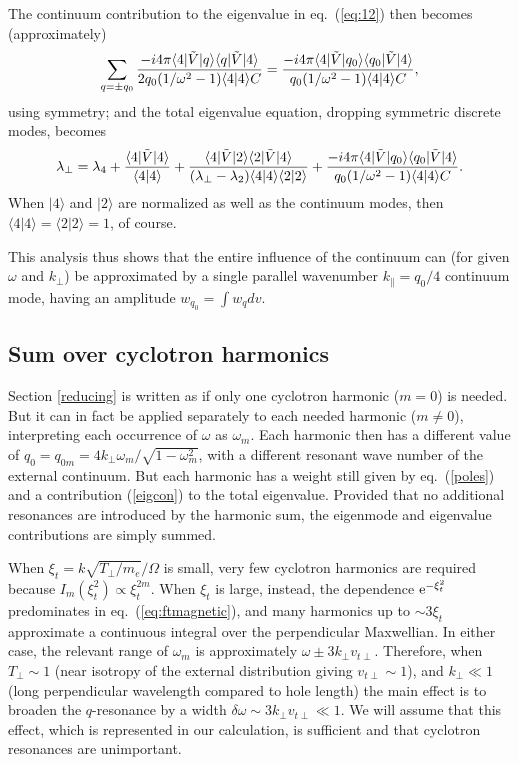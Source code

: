 \documentclass[12pt]{article}
\def\ket#1{|#1\rangle}
\def\bra#1{\langle#1}
\def\etothe#1{{\rm e}^{#1}}
\begin{document}
The continuum contribution to the eigenvalue in eq.\ (\ref{eq:12}) then
becomes (approximately)
\begin{equation}
  \label{eigcon}
  \sum_{q=\pm q_0} {-i4\pi\bra{4}|\tilde V \ket{q}\bra{q}|\tilde{V}\ket{4}
    \over
    2q_0(1/\omega^2-1)\bra{4}\ket{4}C}
  ={-i4\pi\bra{4}|\tilde V \ket{q_0}\bra{q_0}|\tilde{V}\ket{4}
    \over
    q_0(1/\omega^2-1)\bra{4}\ket{4}C},
\end{equation}
using symmetry; and the total eigenvalue equation, dropping symmetric discrete modes, becomes
\begin{equation}
  \label{eigtotal}
  \lambda_\perp=\lambda_4+{\bra{4}|\tilde{V}\ket{4}\over
    \bra{4}\ket{4}}
    +{\bra{4}|\tilde{V}\ket{2}\bra{2}|\tilde{V}\ket{4}\over
      (\lambda_\perp-\lambda_2)\bra{4}\ket{4} \bra{2}\ket{2}}
    +%
    {-i4\pi\bra{4}|\tilde V \ket{q_0}\bra{q_0}|\tilde{V}\ket{4}
    \over
    q_0(1/\omega^2-1)\bra{4}\ket{4}C}.
\end{equation}
When $\ket{4}$ and $\ket{2}$ are normalized as well as the
continuum modes, then $\bra{4}\ket{4}=\bra{2}\ket{2}=1$, of
course.

This analysis thus shows that the entire influence of the continuum
can (for given $\omega$ and $k_\perp$) be approximated by a single
parallel wavenumber $k_\parallel= q_0/4$ continuum mode, having an
amplitude $w_{q_0}=\int w_q dv$.

\subsection{Sum over cyclotron harmonics}

Section \ref{reducing} is written as if only one cyclotron harmonic
($m=0$) is needed. But it can in fact be applied separately to each
needed harmonic ($m\not=0$), interpreting each occurrence of $\omega$
as $\omega_m$. Each harmonic then has a different value of
$q_0=q_{0m}=4k_\perp\omega_m/\sqrt{1-\omega_m^2}$, with a different
resonant wave number of the external continuum. But each harmonic has
a weight still given by eq.\ (\ref{poles}) and a contribution
(\ref{eigcon}) to the total eigenvalue. Provided that no additional
resonances are introduced by the harmonic sum, the eigenmode and
eigenvalue contributions are simply summed.

When $\xi_t=k\sqrt{T_\perp/m_e}/\Omega$ is small, very few cyclotron
harmonics are required because $I_m(\xi_t^2)\propto \xi_t^{2m}$. When
$\xi_t$ is large, instead, the dependence $\etothe{-\xi_t^2}$
predominates in eq.\ (\ref{eq:ftmagnetic}), and many harmonics up to
$\sim 3\xi_t$ approximate a continuous integral over the perpendicular
Maxwellian. In either case, the relevant range of $\omega_m$ is
approximately $\omega\pm 3k_\perp v_{t\perp}$. Therefore, when
$T_\perp \sim 1$ (near isotropy of the external distribution giving
$ v_{t\perp}\sim 1$), and $k_\perp\ll 1$ (long perpendicular wavelength
compared to hole length) the main effect is to broaden the
$q$-resonance by a width
$\delta \omega\sim3k_\perp v_{t\perp}\ll 1 $. We will assume
that this effect, which is represented in our calculation, is
sufficient and that cyclotron resonances are unimportant.
\end{document}
